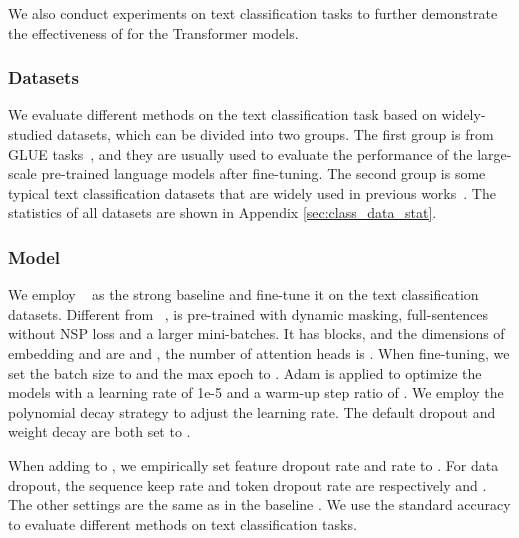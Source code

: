 \documentclass[11pt]{article}
\begin{document}
We also conduct experiments on text classification tasks to further demonstrate the effectiveness of  for the Transformer models.

\subsubsection{Datasets}

We evaluate different methods on the text classification task based on  widely-studied datasets, which can be divided into two groups. The first group is from GLUE tasks~\cite{DBLP:conf/iclr/WangSMHLB19}, and they are usually used to evaluate the performance of the large-scale pre-trained language models after fine-tuning. The second group is some typical text classification datasets that are widely used in previous works~\cite{DBLP:conf/trec/VoorheesT99,DBLP:conf/acl/MaasDPHNP11,DBLP:conf/nips/ZhangZL15}. The statistics of all datasets are shown in Appendix \ref{sec:class_data_stat}. 


\subsubsection{Model}
We employ ~\cite{liu2019roberta} as the strong baseline and fine-tune it on the text classification datasets. Different from ~\cite{devlin2019bert},  is pre-trained with dynamic masking, full-sentences without NSP loss and a larger mini-batches. It has  blocks, and the dimensions of embedding and  are  and , the number of attention heads is . When fine-tuning, we set the batch size to  and the max epoch to . Adam is applied to optimize the models with a learning rate of 1e-5 and a warm-up step ratio of . We employ the polynomial decay strategy to adjust the learning rate. The default dropout and weight decay are both set to .

When adding  to , we empirically set feature dropout rate and  rate to . For data dropout, the sequence keep rate  and token dropout rate  are respectively  and . The other settings are the same as in the baseline . We use the standard accuracy to evaluate different methods on text classification tasks.
\end{document}
